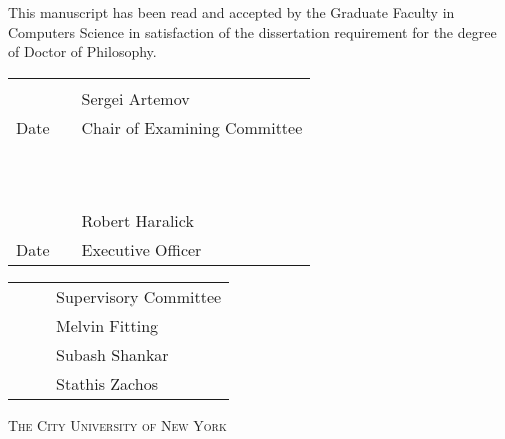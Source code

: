 \documentclass[letterpaper, 12pt, oneside]{book}
\begin{document}


\setcounter{page}{3}
\begin{center}
    
    \vspace{.5in}
    This manuscript has been read and accepted by the Graduate Faculty 
    in Computers Science in satisfaction of the dissertation requirement for the degree of Doctor of Philosophy.
    \end{center}
    
    \vspace{1.0in}
    
    \begin{tabular}{p{1.75in}p{0.5in}p{3.5in}}
    \hrulefill                          & &\hrulefill \\
    ~	  			     & & Sergei Artemov\\
    Date                                & & Chair of Examining Committee\\
    ~                                   & & \\
    
    ~                                   & & \\
    \hrulefill                          & &\hrulefill \\
    ~                                   & & Robert Haralick\\
    Date                                & & Executive Officer\\
    \end{tabular}
    
    \vspace{0.75in}
    
    \begin{tabular}{p{1.75in}p{0.5in}p{3.5in}}
    ~ 				& &  Supervisory Committee \\
    ~ 				& &  Melvin Fitting \\
    ~				& &  Subash Shankar \\
    ~				& &  Stathis Zachos \\
    \end{tabular}
    
    
    \vspace{\fill}
    \begin{center}
    \textsc{The City University of New York}
\end{center}
\clearpage
\end{document}
